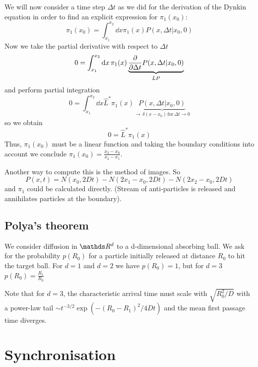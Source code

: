 \documentclass{notebook}
\begin{document}
We will now consider a time step $\Delta t$ as we did for the derivation of the Dynkin equation in order to find an explicit expression for $\pi_1(x_0)$:
%
\begin{equation*}
\pi_1(x_0) = \int_{x_1}^{x_2} \dd{x} \pi_1(x) P(x, \Delta t | x_0, 0)
\end{equation*}
%
Now we take the partial derivative with respect to $\Delta t$ 
%
\begin{equation*}
0 = \int_{x_1}^{x_2} \dd{x} \pi_1(x) \underbrace{\pdv{\Delta t} P(x, \Delta t | x_0, 0)}_{\hat{L} P}
\end{equation*}
%
and perform partial integration
%
\begin{equation*}
0 = \int_{x_1}^{x_2} \dd{x} \hat{L}^* \pi_1(x) \underbrace{P(x, \Delta t | x_0, 0)}_{\to \, \delta(x-x_0) \, \mathrm{for} \, \Delta t \to 0}
\end{equation*}
%
so we obtain
%
\begin{equation*}
0 = \hat{L}^* \pi_1(x)
\end{equation*}
%
Thus, $\pi_1(x_0)$ must be a linear function and taking the boundary conditions into account we conclude $\pi_1(x_0) = \frac{x_2-x_0}{x_2-x_1}$.

Another way to compute this is the method of images. So 
%
\begin{equation}
P(x,t) = N(x_0, 2Dt) - N(2x_1-x_0, 2Dt) - N(2x_2 - x_0, 2Dt)
\end{equation}
%
and $\pi_1$ could be calculated directly. (Stream of anti-particles is released and annihilates particles at the boundary).

\section{Polya's theorem}

We consider diffusion in $\R^d$ to a d-dimensional absorbing ball. We ask for the probability $p(R_0)$ for a particle initially released at distance $R_0$ to hit the target ball. For $d = 1$ and $d = 2$ we have $p(R_0) = 1$, but for $d = 3$ $p(R_0) = \frac{R_1}{R_0}$

Note that for $d = 3$, the characteristic arrival time must scale with $\sqrt{R^2_0/D}$ with a power-law tail $\sim t^{-3/2} \exp(- (R_0-R_1)^2/4 D t)$ and the mean first passage time diverges.

\chapter{Synchronisation}
\end{document}
